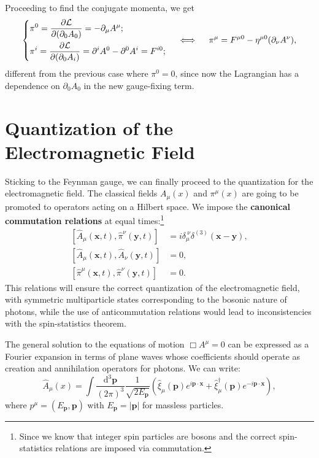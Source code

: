 Proceeding to find the conjugate momenta, we get
\[
    \begin{dcases}
        \pi^0 = \frac{\partial \mathcal{L}}{\partial (\partial_0 A_{0})} = -\partial_\mu A^{\mu}; \\
        \pi^i = \frac{\partial \mathcal{L}}{\partial (\partial_0 A_{i})} = \partial^i A^{0} - \partial^0 A^{i} = F^{i0};
    \end{dcases} \quad \iff \quad \pi^{\mu} = F^{\mu 0} - \eta^{\mu 0} (\partial_\nu A^{\nu}),
\]
different from the previous case where \(\pi^0 = 0\), since now the Lagrangian has a dependence on \(\partial_0 A_0\) in the new gauge-fixing term.

\section{Quantization of the Electromagnetic Field}

Sticking to the Feynman gauge, we can finally proceed to the quantization for the electromagnetic field. The classical fields \(A_{\mu}(x)\) and \(\pi^{\mu}(x)\) are going to be promoted to operators acting on a Hilbert space. We impose the \textbf{canonical commutation relations} at equal times:\footnote{Since we know that integer spin particles are bosons and the correct spin-statistics relations are imposed via commutation.}
\begin{equation}
    \begin{aligned}
        \left[\hat{A}_{\mu}(\mathbf{x}, t), \hat{\pi}^{\nu}(\mathbf{y}, t)\right]   & = i \delta_{\mu}^{\ \nu} \delta^{(3)}(\mathbf{x} - \mathbf{y}), \\
        \left[\hat{A}_{\mu}(\mathbf{x}, t), \hat{A}_{\nu}(\mathbf{y}, t)\right]     & = 0,                                                            \\
        \left[\hat{\pi}^{\mu}(\mathbf{x}, t), \hat{\pi}^{\nu}(\mathbf{y}, t)\right] & = 0.
    \end{aligned}
    \label{eq:canonical_commutation_relations_em_field}
\end{equation}
This relations will ensure the correct quantization of the electromagnetic field, with symmetric multiparticle states corresponding to the bosonic nature of photons, while the use of anticommutation relations would lead to inconsistencies with the spin-statistics theorem.

The general solution to the equations of motion \(\Box A^{\mu} = 0\) can be expressed as a Fourier expansion in terms of plane waves whose coefficients should operate as creation and annihilation operators for photons. We can write:
\[
    \hat{A}_{\mu}(x) = \int \frac{\mathrm{d}^3 \mathbf{p}}{(2\pi)^3} \frac{1}{\sqrt{2 E_{\mathbf{p}}}} \left( \hat{\xi}_{\mu}(\mathbf{p}) e^{i \mathbf{p} \cdot \mathbf{x}} + \hat{\xi}_{\mu}^{\dagger}(\mathbf{p}) e^{-i \mathbf{p} \cdot \mathbf{x}} \right),
\]
where \(p^{\mu} = (E_{\mathbf{p}}, \mathbf{p})\) with \(E_{\mathbf{p}} = \vert \mathbf{p} \vert\) for massless particles.

